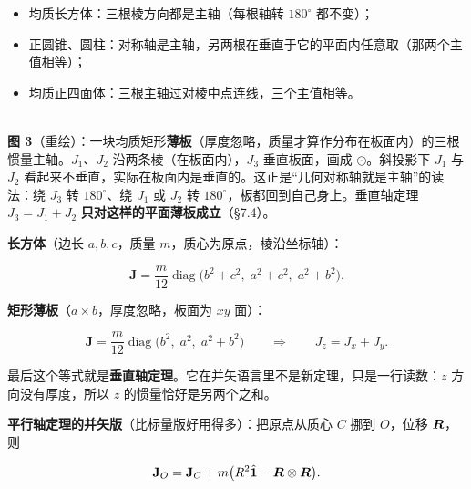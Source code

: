 \documentclass[11pt]{ctexart}
\newcommand{\ten}[1]{\mathbf{#1}}
\newcommand{\unitd}{\hat{\ten{1}}}
\let\origsubhdr\subhdr
\renewcommand{\subhdr}[1]{\par\needspace{3\baselineskip}\origsubhdr{#1}}
\begin{document}
\begin{itemize}
\item 均质长方体：三根棱方向都是主轴（每根轴转 $180^\circ$ 都不变）；
\item 正圆锥、圆柱：对称轴是主轴，另两根在垂直于它的平面内任意取（那两个主值相等）；
\item 均质正四面体：三根主轴过对棱中点连线，三个主值相等。
\end{itemize}

\begin{center}
\\[2pt]
{\small\color{inkgray}\textbf{图 3}（重绘）：一块均质矩形\textbf{薄板}（厚度忽略，质量才算作分布在板面内）的三根惯量主轴。$J_1$、$J_2$ 沿两条棱（在板面内），$J_3$ 垂直板面，画成 $\odot$。斜投影下 $J_1$ 与 $J_2$ 看起来不垂直，实际在板面内是垂直的。这正是“几何对称轴就是主轴”的读法：绕 $J_3$ 转 $180^\circ$、绕 $J_1$ 或 $J_2$ 转 $180^\circ$，板都回到自己身上。垂直轴定理 $J_3=J_1+J_2$ \textbf{只对这样的平面薄板成立}（§7.4）。}
\end{center}


\textbf{长方体}（边长 $a,b,c$，质量 $m$，质心为原点，棱沿坐标轴）：

\[
\ten J=\frac{m}{12}\operatorname{diag}\bigl(b^2+c^2,\;a^2+c^2,\;a^2+b^2\bigr).
\]

\textbf{矩形薄板}（$a\times b$，厚度忽略，板面为 $xy$ 面）：

\[
\ten J=\frac{m}{12}\operatorname{diag}\bigl(b^2,\;a^2,\;a^2+b^2\bigr)
\qquad\Longrightarrow\qquad J_z=J_x+J_y .
\]

最后这个等式就是\textbf{垂直轴定理}。它在并矢语言里不是新定理，只是一行读数：$z$ 方向没有厚度，所以 $z$ 的惯量恰好是另两个之和。

\textbf{平行轴定理的并矢版}（比标量版好用得多）：把原点从质心 $C$ 挪到 $O$，位移 $\boldsymbol{R}$，则

\[
\ten J_O=\ten J_C+m\bigl(R^2\unitd-\vect R\otimes\vect R\bigr).
\]
\end{document}
